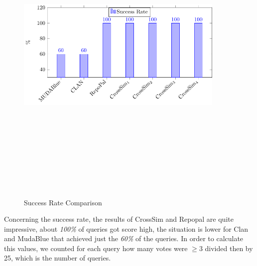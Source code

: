 \begin{figure}[!h]
\includegraphics[width=10cm,height=15cm,keepaspectratio]{images/SuccessRate.pdf}
\centering
\caption{Success Rate Comparison}
\label{fig:Success}
\end{figure}

Concerning the success rate, the results of CrossSim and Repopal are quite impressive, about \emph{100\%} of queries got score high, the situation is lower for Clan and MudaBlue that achieved just the \emph{60\%} of the queries. In order to calculate this values, we counted for each query how many votes were \emph{$\geq3$} divided then by 25, which is the number of queries.


